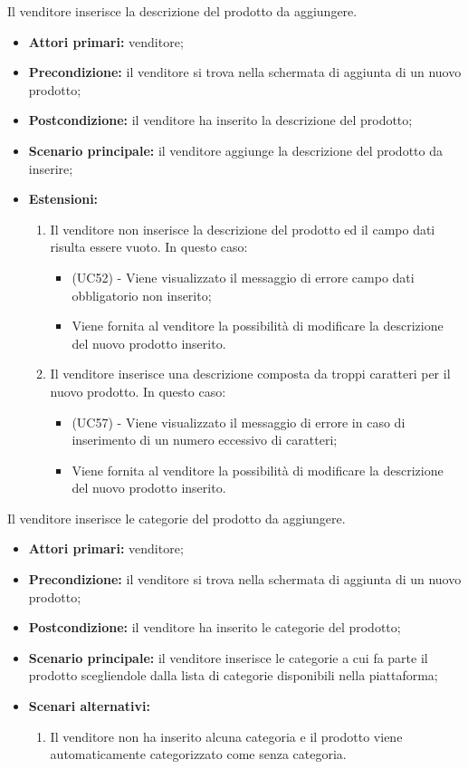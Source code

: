 Il venditore inserisce la descrizione del prodotto da aggiungere.
\begin{itemize}
    \item \textbf{Attori primari:} venditore;
    \item \textbf{Precondizione:} il venditore si trova nella schermata di aggiunta di un nuovo prodotto;
    \item \textbf{Postcondizione:} il venditore ha inserito la descrizione del prodotto;
    \item \textbf{Scenario principale:} il venditore aggiunge la descrizione del prodotto da inserire;
    \item \textbf{Estensioni:}
    \begin{enumerate}[label=\lett]
    	\item Il venditore non inserisce la descrizione del prodotto ed il campo dati risulta essere vuoto. In questo caso:
    	\begin{itemize}
    		\item (UC52) - Viene visualizzato il messaggio di errore campo dati obbligatorio non inserito;
    		\item Viene fornita al venditore la possibilità di modificare la descrizione del nuovo prodotto inserito.
    	\end{itemize}
        \item Il venditore inserisce una descrizione composta da troppi caratteri per il nuovo prodotto. In questo caso:
	    \begin{itemize}
    		\item (UC57) - Viene visualizzato il messaggio di errore in caso di inserimento di un numero eccessivo di caratteri;
	    	\item Viene fornita al venditore la possibilità di modificare la descrizione del nuovo prodotto inserito.
	    \end{itemize}
    \end{enumerate}
\end{itemize}

Il venditore inserisce le categorie del prodotto da aggiungere.
\begin{itemize}
    \item \textbf{Attori primari:} venditore;
    \item \textbf{Precondizione:} il venditore si trova nella schermata di aggiunta di un nuovo prodotto;
    \item \textbf{Postcondizione:} il venditore ha inserito le categorie del prodotto;
    \item \textbf{Scenario principale:} il venditore inserisce le categorie a cui fa parte il prodotto scegliendole dalla lista di categorie disponibili nella piattaforma;
    \item \textbf{Scenari alternativi:}
    \begin{enumerate}[label=\lett]
    	\item Il venditore non ha inserito alcuna categoria e il prodotto viene automaticamente categorizzato come senza categoria.
    \end{enumerate}
\end{itemize}

